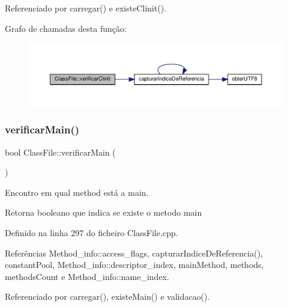 Referenciado por carregar() e existe\+Clinit().

Grafo de chamadas desta função\+:
\nopagebreak
\begin{figure}[H]
\begin{center}
\leavevmode
\includegraphics[width=350pt]{classClassFile_ab0394185a299f35a9b5be68143385e84_cgraph}
\end{center}
\end{figure}
\mbox{\label{classClassFile_ae8e4445e763c4ee7c04995fcea0369e0}} 
\subsubsection{\texorpdfstring{verificar\+Main()}{verificarMain()}}
{\footnotesize\ttfamily bool Class\+File\+::verificar\+Main (\begin{DoxyParamCaption}{ }\end{DoxyParamCaption})\hspace{0.3cm}{\ttfamily [private]}}



Encontro em qual method está a main. 

\begin{DoxyReturn}{Retorna}
booleano que indica se existe o metodo main 
\end{DoxyReturn}


Definido na linha 297 do ficheiro Class\+File.\+cpp.



Referências Method\+\_\+info\+::access\+\_\+flags, capturar\+Indice\+De\+Referencia(), constant\+Pool, Method\+\_\+info\+::descriptor\+\_\+index, main\+Method, methods, methods\+Count e Method\+\_\+info\+::name\+\_\+index.



Referenciado por carregar(), existe\+Main() e validacao().

